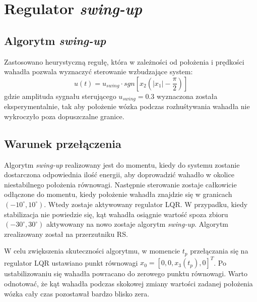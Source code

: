 \section{Regulator \textit{swing-up}}
\subsection{Algorytm \textit{swing-up}}
Zastosowano heurystyczną regułę, która w zależności od położenia i prędkości wahadła pozwala wyznaczyć sterowanie wzbudzające system:
\begin{equation}  
u(t) = u_{swing}\cdot sgn[x_2(|x_1|-\frac{\pi}{2})]
\end{equation} 
gdzie amplituda sygnału sterującego $u_{swing} = 0.3$ wyznaczona została eksperymentalnie, tak aby położenie wózka podczas rozhuśtywania wahadła nie wykroczyło poza dopuszczalne granice. 
\subsection{Warunek przełączenia}
Algorytm \textit{swing-up} realizowany jest do momentu, kiedy do systemu zostanie dostarczona odpowiednia ilość energii, aby doprowadzić wahadło w okolice niestabilnego położenia równowagi.
Następnie sterowanie zostaje całkowicie odłączone do momentu, kiedy położenie wahadła znajdzie się w granicach $(-10^\circ,10^\circ)$. Wtedy zostaje aktywowany regulator LQR. W przypadku, kiedy stabilizacja nie powiedzie się, kąt wahadła osiągnie wartość spoza zbioru $(-30^\circ,30^\circ)$ aktywowany na nowo zostaje algorytm \textit{swing-up}. Algorytm zrealizowany został na przerzutniku RS.

W celu zwiększenia skuteczności algorytmu, w momencie $t_p$ przełączania się na regulator LQR ustawiano punkt równowagi $x_0=[0,0,x_3(t_p),0]^T$. Po ustabilizowaniu się wahadła powracano do zerowego punktu równowagi. Warto odnotować, że kąt wahadła podczas skokowej zmiany wartości zadanej położenia wózka cały czas pozostawał bardzo blisko zera.
